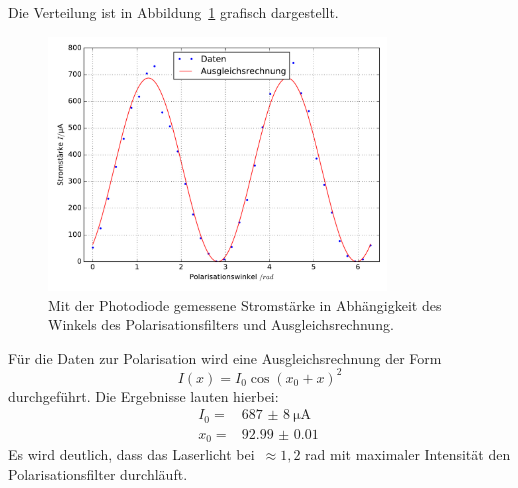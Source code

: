 %
Die Verteilung ist in Abbildung~\ref{fig:polarisation} grafisch dargestellt.
%
\begin{figure}[htb]
  \centering
  \includegraphics[width=0.8\textwidth]{auswertung/plot_polarisation.pdf}
  \caption{Mit der Photodiode gemessene Stromstärke in Abhängigkeit des Winkels des Polarisationsfilters und Ausgleichsrechnung.}
  \label{fig:polarisation}
\end{figure}
%
Für die Daten zur Polarisation wird eine Ausgleichsrechnung der Form
%
\begin{equation}
  I(x)=I_0\cos(x_0+x)^2
\end{equation}
%
durchgeführt. Die Ergebnisse lauten hierbei:
%
\begin{align*}
  I_0=&\SI{687(8)}{\micro\ampere} \\
  x_0=&\SI{92.99(1)}{}
\end{align*}
%
Es wird deutlich, dass das Laserlicht bei~$\approx 1,2$ rad mit maximaler Intensität den Polarisationsfilter durchläuft.
%
